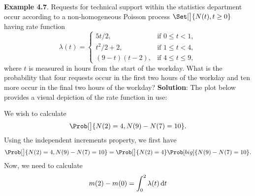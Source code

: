 \begin{Example}
    \textbf{Example 4.7}. Requests for technical support within the statistics department occur according
    to a non-homogeneous Poisson process $ \Set[\big]{N(t),t\ge 0} $ having rate function
    \[ \lambda(t)=\begin{cases}
            5t/2,       & \text{if $0\le t<1$},    \\
            t^2/2+2,    & \text{if $1\le t<4$},    \\
            (9-t)(t-2), & \text{if $4\le t\le 9$},
        \end{cases} \]
    where $t$ is measured in hours from the start of the workday. What is the probability that four
    requests occur in the first two hours of the workday and ten more occur in the final two hours
    of the workday?
    \tcblower{}
    \textbf{Solution}: The plot below provides a visual depiction of the rate function in use:
    \begin{center}
    \end{center}
    We wish to calculate
    \[ \Prob[\big]{N(2)=4,N(9)-N(7)=10}. \]
    Using the independent increments property, we first have
    \[ \Prob[\big]{N(2)=4,N(9)-N(7)=10}=
        \Prob[\big]{N(2)=4}\Prob[big]{N(9)-N(7)=10}. \]
    Now, we need to calculate
    \begin{align*}
        m(2)-m(0)
         & =\int_{0}^{2}\lambda(t)\odif{t}                                                      \\

\end{align*}
\end{Example}
